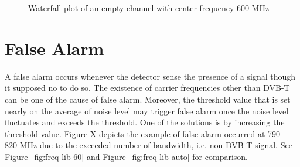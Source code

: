 \begin{figure}[H]
\begin{subfigure}[b]{0.45\textwidth}
    \end{subfigure}
    \caption{Waterfall plot of an empty channel with center frequency 600 MHz}\label{fig:no-signal}
\end{figure}

\section{False Alarm}

A false alarm occurs whenever the detector sense the presence of a signal though it supposed no to do so. The existence of carrier frequencies other than DVB-T can be one of the cause of false alarm. Moreover, the threshold value that is set nearly on the average of noise level may trigger false alarm once the noise level fluctuates and exceeds the threshold. One of the solutions is by increasing the threshold value. Figure X depicts the example of false alarm occurred at 790 - 820 MHz due to the exceeded number of bandwidth, i.e. non-DVB-T signal. See Figure~\ref{fig:freq-lib-60} and Figure~\ref{fig:freq-lib-auto} for comparison.

